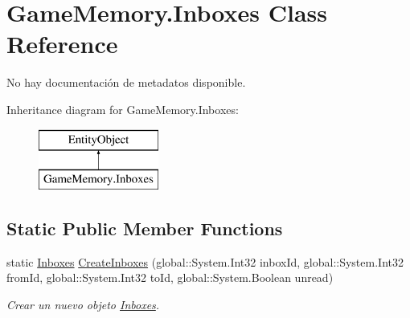 \hypertarget{class_game_memory_1_1_inboxes}{\section{Game\-Memory.\-Inboxes Class Reference}
\label{class_game_memory_1_1_inboxes}
}


No hay documentación de metadatos disponible.  


Inheritance diagram for Game\-Memory.\-Inboxes\-:\begin{figure}[H]
\begin{center}
\leavevmode
\includegraphics[height=2.000000cm]{class_game_memory_1_1_inboxes}
\end{center}
\end{figure}
\subsection*{Static Public Member Functions}
\begin{DoxyCompactItemize}
\item 
static \hyperlink{class_game_memory_1_1_inboxes}{Inboxes} \hyperlink{class_game_memory_1_1_inboxes_a7bed8cd2f581bd958979c2f46a3c52f5}{Create\-Inboxes} (global\-::\-System.\-Int32 inbox\-Id, global\-::\-System.\-Int32 from\-Id, global\-::\-System.\-Int32 to\-Id, global\-::\-System.\-Boolean unread)
\begin{DoxyCompactList}\small\item\em Crear un nuevo objeto \hyperlink{class_game_memory_1_1_inboxes}{Inboxes}. \end{DoxyCompactList}\end{DoxyCompactItemize}
